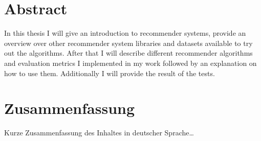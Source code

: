 \begingroup
\let\clearpage\relax
\let\cleardoublepage\relax
\let\cleardoublepage\relax

\chapter*{Abstract}
In this thesis I will give an introduction to recommender systems,
provide an overview over other recommender system libraries and
datasets available to try out the algorithms. After that I will
describe different recommender algorithms and evaluation metrics
I implemented in my work followed by an explanation on how to use them.
Additionally I will provide the result of the tests.


\vfill

\chapter*{Zusammenfassung}
Kurze Zusammenfassung des Inhaltes in deutscher Sprache\dots


\endgroup			

\vfill

\cleardoublepage
